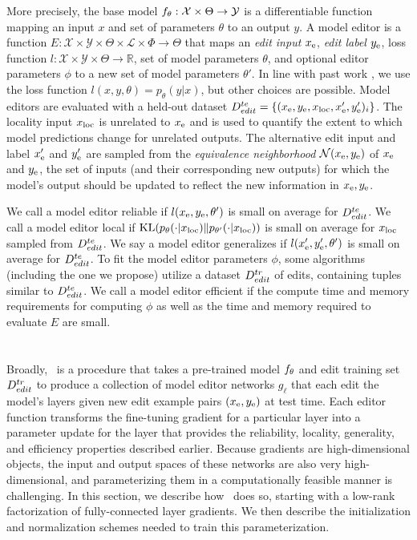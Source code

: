 \documentclass{article}
\begin{document}
More precisely, the base model $f_\theta:\mathcal{X} \times \Theta \rightarrow \mathcal{Y}$ is a differentiable function mapping an input $x$ and set of parameters $\theta$ to an output $y$. A model editor is a function $E : \mathcal{X} \times \mathcal{Y} \times \Theta \times \mathcal{L} \times \Phi \rightarrow \Theta$ that maps an \textit{edit input} $x_\text{e}$, \textit{edit label} $y_\text{e}$, loss function $l:\mathcal{X} \times \mathcal{Y} \times \Theta \rightarrow \mathbb{R}$, set of model parameters $\theta$, and optional editor parameters $\phi$ to a new set of model parameters $\theta'$. In line with past work \citep{Sinitsin2020Editable,Cao2021EditingFK}, we use the loss function $l(x,y,\theta) = p_\theta(y|x)$, but other choices are possible. Model editors are evaluated with a held-out dataset $D^{te}_{edit} = \{(x_\text{e},y_\text{e},x_\text{loc},x_\text{e}',y_\text{e}')_i\}$. The locality input $x_\text{loc}$ is unrelated to $x_\text{e}$ and is used to quantify the extent to which model predictions change for unrelated outputs. The alternative edit input and label $x_\text{e}'$ and $y_\text{e}'$ are sampled from the \textit{equivalence neighborhood} $\mathcal{N}(x_\text{e},y_\text{e})$ of $x_\text{e}$ and $y_\text{e}$, the set of inputs (and their corresponding new outputs) for which the model's output should be updated to reflect the new information in $x_\text{e},y_\text{e}$.

We call a model editor reliable if $l(x_\text{e},y_\text{e},\theta')$ is small on average for $D^{te}_{edit}$. We call a model editor local if $\text{KL}(p_\theta(\cdot | x_\text{loc}) \| p_{\theta'}(\cdot | x_\text{loc}))$ is small on average for $x_\text{loc}$ sampled from $D^{te}_{edit}$. We say a model editor generalizes if $l(x_\text{e}',y_\text{e}',\theta')$ is small on average for $D^{te}_{edit}$. To fit the model editor parameters $\phi$, some algorithms (including the one we propose) utilize a dataset $D^{tr}_{edit}$ of edits, containing tuples similar to $D^{te}_{edit}$. We call a model editor efficient if the compute time and memory requirements for computing $\phi$ as well as the time and memory required to evaluate $E$ are small.

\section{\fullname}
Broadly, \name~is a procedure that takes a pre-trained model $f_\theta$ and edit training set $D^{tr}_{edit}$ to produce a collection of model editor networks $g_\ell$ that each edit the model's layers given new edit example pairs $(x_\text{e}, y_\text{e})$ at test time. Each editor function transforms the fine-tuning gradient for a particular layer into a parameter update for the layer that provides the reliability, locality, generality, and efficiency properties described earlier. Because gradients are high-dimensional objects, the input and output spaces of these networks are also very high-dimensional, and parameterizing them in a computationally feasible manner is challenging. In this section, we describe how \name~does so, starting with a low-rank factorization of fully-connected layer gradients. We then describe the initialization and normalization schemes needed to train this parameterization.
\end{document}
